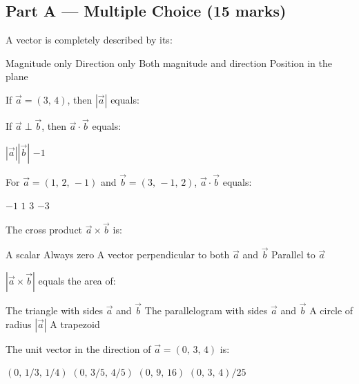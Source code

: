 \documentclass[addpoints]{exam}
\begin{document}
\newpage
\begin{questions}

\section*{Part A --- Multiple Choice (15 marks)}
\vspace{5mm}

\question[1] A vector is completely described by its:
\begin{choices}
    \choice Magnitude only
    \choice Direction only
    \correctchoice Both magnitude and direction
    \choice Position in the plane
\end{choices}

\question[1] If $\vec{a} = (3,\, 4)$, then $|\vec{a}|$ equals:
\begin{choices}
\end{choices}

\question[1] If $\vec{a} \perp \vec{b}$, then $\vec{a} \cdot \vec{b}$ equals:
\begin{choices}
    \choice $|\vec{a}||\vec{b}|$
    \choice $-1$
\end{choices}

\question[1] For $\vec{a} = (1,\, 2,\, -1)$ and $\vec{b} = (3,\, -1,\, 2)$,
$\vec{a} \cdot \vec{b}$ equals:
\begin{choices}
    \correctchoice $-1$
    \choice $1$
    \choice $3$
    \choice $-3$
\end{choices}

\question[1] The cross product $\vec{a} \times \vec{b}$ is:
\begin{choices}
    \choice A scalar
    \choice Always zero
    \correctchoice A vector perpendicular to both $\vec{a}$ and $\vec{b}$
    \choice Parallel to $\vec{a}$
\end{choices}

\question[1] $|\vec{a} \times \vec{b}|$ equals the area of:
\begin{choices}
    \choice The triangle with sides $\vec{a}$ and $\vec{b}$
    \correctchoice The parallelogram with sides $\vec{a}$ and $\vec{b}$
    \choice A circle of radius $|\vec{a}|$
    \choice A trapezoid
\end{choices}

\question[1] The unit vector in the direction of $\vec{a} = (0,\, 3,\, 4)$ is:
\begin{choices}
    \choice $(0,\, 1/3,\, 1/4)$
    \correctchoice $(0,\, 3/5,\, 4/5)$
    \choice $(0,\, 9,\, 16)$
    \choice $(0,\, 3,\, 4)/25$
\end{choices}


\end{questions}
\end{document}
